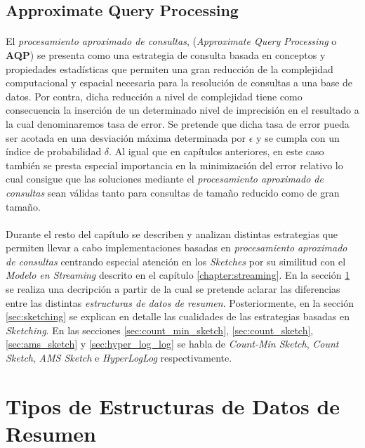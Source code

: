 \documentclass{subfiles}
\begin{document}
      \subsection{Approximate Query Processing}
      \label{sec:aproximate_query_processing}

        \paragraph{}
        El \emph{procesamiento aproximado de consultas}, (\emph{Approximate Query Processing} o \textbf{AQP}) se presenta como una estrategia de consulta basada en conceptos y propiedades estadísticas que permiten una gran reducción de la complejidad computacional y espacial necesaria para la resolución de consultas a una base de datos. Por contra, dicha reducción a nivel de complejidad tiene como consecuencia la inserción de un determinado nivel de imprecisión en el resultado a la cual denominaremos tasa de error. Se pretende que dicha tasa de error pueda ser acotada en una desviación máxima determinada por $\epsilon$ y se cumpla con un índice de probabilidad $\delta$. Al igual que en capítulos anteriores, en este caso también se presta especial importancia en la minimización del error relativo lo cual consigue que las soluciones mediante el \emph{procesamiento aproximado de consultas} sean válidas tanto para consultas de tamaño reducido como de gran tamaño.


      \paragraph{}
      Durante el resto del capítulo se describen y analizan distintas estrategias que permiten llevar a cabo implementaciones basadas en \emph{procesamiento aproximado de consultas} centrando especial atención en los \emph{Sketches} por su similitud con el \emph{Modelo en Streaming} descrito en el capítulo \ref{chapter:streaming}. En la sección \ref{sec:summaries_types} se realiza una decripción a partir de la cual se pretende aclarar las diferencias entre las distintas \emph{estructuras de datos de resumen}. Posteriormente, en la sección \ref{sec:sketching} se explican en detalle las cualidades de las estrategias basadas en \emph{Sketching}. En las secciones \ref{sec:count_min_sketch}, \ref{sec:count_sketch}, \ref{sec:ams_sketch} y \ref{sec:hyper_log_log} se habla de \emph{Count-Min Sketch}, \emph{Count Sketch}, \emph{AMS Sketch} e \emph{HyperLogLog} respectivamente.


    \section{Tipos de Estructuras de Datos de Resumen}
    \label{sec:summaries_types}
\end{document}
